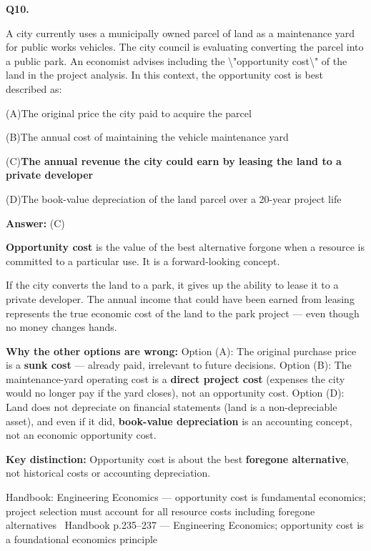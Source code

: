 \documentclass[11pt]{article}
\newcommand{\correct}[1]{\textbf{#1}\;{\color{accent}$\checkmark$}}
\newcommand{\optline}[2]{\par\noindent\hspace{1.2em}(#1)\hspace{0.6em}#2}
\begin{document}
\vspace{9pt}
\filbreak
\textbf{\color{accent}Q10.}\par\vspace{2pt}
A city currently uses a municipally owned parcel of land as a maintenance yard for public works vehicles. The city council is evaluating converting the parcel into a public park. An economist advises including the \textbackslash{}"opportunity cost\textbackslash{}" of the land in the project analysis. In this context, the opportunity cost is best described as:\par\par\vspace{3pt}
\optline{A}{The original price the city paid to acquire the parcel}
\optline{B}{The annual cost of maintaining the vehicle maintenance yard}
\optline{C}{\correct{The annual revenue the city could earn by leasing the land to a private developer}}
\optline{D}{The book-value depreciation of the land parcel over a 20-year project life}
\par\vspace{3pt}
\vspace{2pt}\par\noindent\colorbox{boxbg}{\parbox{\dimexpr\linewidth-2\fboxsep\relax}{%
\vspace{2pt}\textbf{Answer:} (C)\par\vspace{2pt}
{\small \textbf{Opportunity cost} is the value of the best alternative forgone when a resource is committed to a particular use. It is a forward-looking concept.\par
If the city converts the land to a park, it gives up the ability to lease it to a private developer. The annual income that could have been earned from leasing represents the true economic cost of the land to the park project --- even though no money changes hands.\par
\textbf{Why the other options are wrong:} Option (A): The original purchase price is a \textbf{sunk cost} --- already paid, irrelevant to future decisions. Option (B): The maintenance-yard operating cost is a \textbf{direct project cost} (expenses the city would no longer pay if the yard closes), not an opportunity cost. Option (D): Land does not depreciate on financial statements (land is a non-depreciable asset), and even if it did, \textbf{book-value depreciation} is an accounting concept, not an economic opportunity cost.\par
\textbf{Key distinction:} Opportunity cost is about the best \textbf{foregone alternative}, not historical costs or accounting depreciation.\par}\par\vspace{2pt}
{\footnotesize\color{soft}Handbook: Engineering Economics --- opportunity cost is fundamental economics; project selection must account for all resource costs including foregone alternatives \textbullet\ Handbook p.235--237 --- Engineering Economics; opportunity cost is a foundational economics principle}\vspace{2pt}
}}
\end{document}
